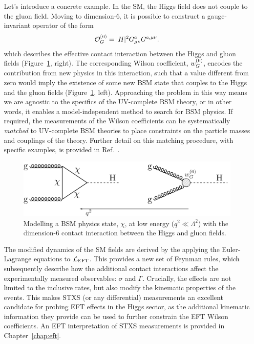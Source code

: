 Let's introduce a concrete example. In the SM, the Higgs field does not couple to the gluon field. Moving to dimension-6, it is possible to construct a gauge-invariant operator of the form
\begin{equation}
    \mathcal{O}^{\rm{(6)}}_G = |H|^2G^a_{\mu\nu}G^{a,\mu\nu}.
\end{equation}
\noindent
which describes the effective contact interaction between the Higgs and gluon fields (Figure~\ref{fig:eft_gluon}, right). The corresponding Wilson coefficient, $w^{\rm{(6)}}_G$, encodes the contribution from new physics in this interaction, such that a value different from zero would imply the existence of some new BSM state that couples to the Higgs and the gluon fields (Figure~\ref{fig:eft_gluon}, left). Approaching the problem in this way means we are agnostic to the specifics of the UV-complete BSM theory, or in other words, it enables a model-independent method to search for BSM physics. If required, the measurements of the Wilson coefficients can be systematically \textit{matched} to UV-complete BSM theories to place constraints on the particle masses and couplings of the theory. Further detail on this matching procedure, with specific examples, is provided in Ref.~\cite{Marzocca:2020jze}. 

\begin{figure}
  \centering
  \includegraphics[width=.8\linewidth]{Figures/theory/og_operator.pdf}
  \caption[Higgs-gluon contact interaction]
  {
    Modelling a BSM physics state, $\chi$, at low energy ($q^2\ll\Lambda^2$) with the dimension-6 contact interaction between the Higgs and gluon fields.
  }
  \label{fig:eft_gluon}
\end{figure}

The modified dynamics of the SM fields are derived by the applying the Euler-Lagrange equations to $\mathcal{L}_{\rm{EFT}}$. This provides a new set of Feynman rules, which subsequently describe how the additional contact interactions affect the experimentally measured observables: $\sigma$ and $\Gamma$. Crucially, the effects are not limited to the inclusive rates, but also modify the kinematic properties of the events. This makes STXS (or any differential) measurements an excellent candidate for probing EFT effects in the Higgs sector, as the additional kinematic information they provide can be used to further constrain the EFT Wilson coefficients. An EFT interpretation of STXS measurements is provided in Chapter~\ref{chap:eft}.

